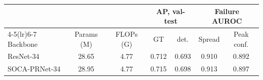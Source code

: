 \begin{tabular}{lcccccc}
\toprule
& & & \multicolumn{2}{c}{AP, val-test} & \multicolumn{2}{c}{Failure AUROC} \\
\cmidrule(lr){4-5}\cmidrule(lr){6-7}
Backbone & Params (M) & FLOPs (G) & GT & det. & Spread & Peak conf. \\
\midrule
ResNet-34 & 28.65 & 4.77 & 0.712 & 0.693 & 0.910 & 0.892 \\
SOCA-PRNet-34 & 28.95 & 4.77 & 0.715 & 0.698 & 0.913 & 0.897 \\
\bottomrule
\end{tabular}
